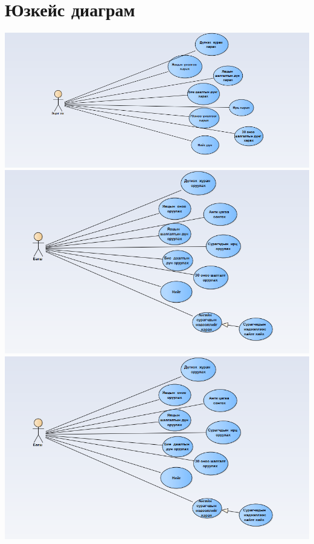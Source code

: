 \documentclass[12pd]{article}
\begin{document}
	\section {Юзкейс диаграм}
	\includegraphics[width=\textwidth]{Usecase1}
	\includegraphics[width=\textwidth]{Usecase2}
	\includegraphics[width=\textwidth]{Usecase3}
\end{document}
